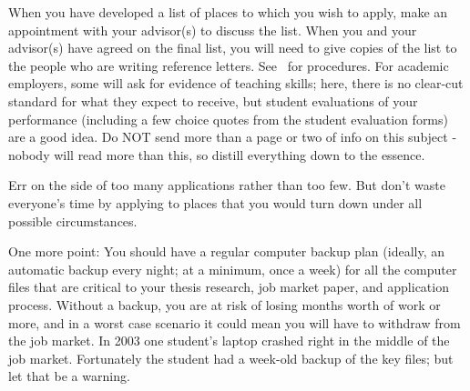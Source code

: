 \documentclass{\classes/econtex}
\begin{document}
When you have developed a list of places to which you wish to apply, make an appointment with your advisor(s) to discuss the list.  When you and your advisor(s) have agreed on the final list, you will need to give copies of the list to the people who are writing reference letters.  See \recLet~for procedures. For academic employers, some will ask for evidence of teaching skills; here, there is no clear-cut standard for what they expect to receive, but student evaluations of your performance (including a few choice quotes from the student evaluation forms) are a good idea.  Do NOT send more than a page or two of info on this subject - nobody will read more than this, so distill everything down to the essence.

Err on the side of too many applications rather than too few.  But
don't waste everyone's time by applying to places that you would turn
down under all possible circumstances.

One more point: You should have a regular computer backup plan
(ideally, an automatic backup every night; at a minimum, once a week)
for all the computer files that are critical to your thesis research,
job market paper, and application process.  Without a backup, you are
at risk of losing months worth of work or more, and in a worst case
scenario it could mean you will have to withdraw from the job market.
In 2003 one student's laptop crashed right in the middle of the job
market.  Fortunately the student had a week-old backup of the key
files; but let that be a warning.

\pagebreak
\end{document}
